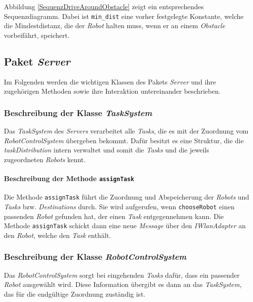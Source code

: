 			Abbildung \ref{SequenzDriveAroundObstacle} zeigt ein entsprechendes Sequenzdiagramm. Dabei ist \texttt{min\_dist} eine vorher festgelegte Konstante, welche die Mindestdistanz, die der \textit{Robot} halten muss, wenn er an einem \textit{Obstacle} vorbeifährt, speichert.
	
\pagebreak
	
\subsection{Paket \textit{Server}}
	Im Folgenden werden die wichtigen Klassen des Pakets \textit{Server} 
	und ihre zugehörigen Methoden sowie ihre Interaktion untereinander beschrieben. 


	\subsubsection{Beschreibung der Klasse \textit{TaskSystem}}
		Das \emph{TaskSystem} des \emph{Servers} verarbeitet alle \emph{Tasks}, die es mit der Zuordnung vom \emph{RobotControlSystem} übergeben bekommt. Dafür besitzt es eine Struktur, die die \emph{taskDistribution} intern verwaltet und somit die \emph{Tasks} und die jeweils zugeordneten \emph{Robots} kennt.
		
			\paragraph{Beschreibung der Methode \texttt{assignTask}}
			Die Methode \texttt{assignTask} führt die Zuordnung und Abspeicherung der \emph{Robots} und \emph{Tasks} bzw. \emph{Destinations} durch. Sie wird aufgerufen, wenn \texttt{chooseRobot} einen passenden \textit{Robot} gefunden hat, der einen \textit{Task} entgegennehmen kann. Die Methode \texttt{assignTask} schickt dann eine neue \textit{Message} über den \textit{IWlanAdapter} an den \textit{Robot}, welche den \textit{Task} enthält.
			
	\subsubsection{Beschreibung der Klasse \textit{RobotControlSystem}}
		Das \emph{RobotControlSystem} sorgt bei eingehenden \emph{Tasks} dafür, dass ein passender \emph{Robot} ausgewählt wird. Diese Information übergibt es dann an das \emph{TaskSystem}, das für die endgültige Zuordnung zuständig ist.
	
